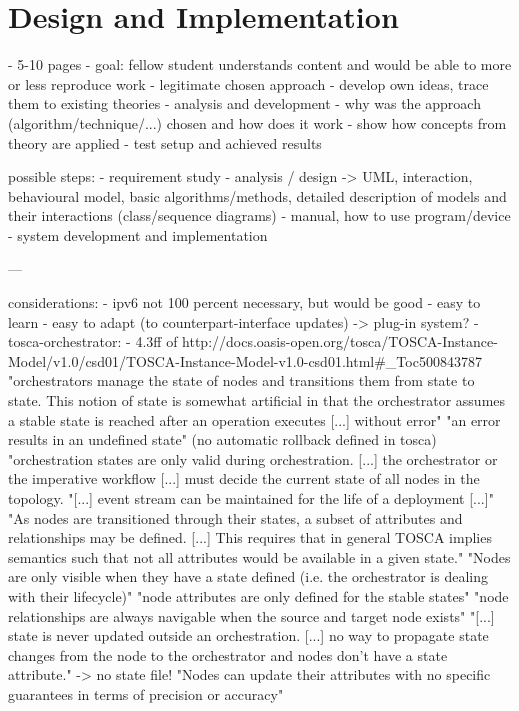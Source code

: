 \chapter{Design and Implementation} %

- 5-10 pages
- goal: fellow student understands content and would be able to more or less reproduce work
- legitimate chosen approach
- develop own ideas, trace them to existing theories
- analysis and development
- why was the approach (algorithm/technique/...) chosen and how does it work
- show how concepts from theory are applied
- test setup and achieved results

possible steps:
- requirement study
- analysis / design -> UML, interaction, behavioural model, basic algorithms/methods, detailed description of models and their interactions (class/sequence diagrams)
- manual, how to use program/device
- system development and implementation

---

considerations:
- ipv6 not 100 percent necessary, but would be good
- easy to learn
- easy to adapt (to counterpart-interface updates) -> plug-in system?
- tosca-orchestrator:
  - 4.3ff of http://docs.oasis-open.org/tosca/TOSCA-Instance-Model/v1.0/csd01/TOSCA-Instance-Model-v1.0-csd01.html#_Toc500843787
    "orchestrators manage the state of nodes and transitions them from state to state. This notion of state is somewhat artificial in that the orchestrator assumes a stable state is reached after an operation executes [...] without error"
    "an error results in an undefined state" (no automatic rollback defined in tosca)
    "orchestration states are only valid during orchestration. [...] the orchestrator or the imperative workflow [...] must decide the current state of all nodes in the topology.
    "[...] event stream can be maintained for the life of a deployment [...]"
    "As nodes are transitioned through their states, a subset of attributes and relationships may be defined. [...] This requires that in general TOSCA implies semantics such that not all attributes would be available in a given state."
    "Nodes are only visible when they have a state defined (i.e. the orchestrator is dealing with their lifecycle)"
    "node attributes are only defined for the stable states"
    "node relationships are always navigable when the source and target node exists"
    "[...] state is never updated outside an orchestration. [...] no way to propagate state changes from the node to the orchestrator and nodes don't have a state attribute."
      -> no state file!
    "Nodes can update their attributes with no specific guarantees in terms of precision or accuracy"

